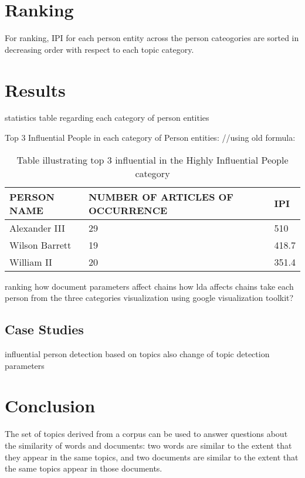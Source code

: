 \section{Ranking}
\label{influential:ranking}

For ranking, IPI for each person entity across the person cateogories are sorted in decreasing order with respect to each topic category.
  


\section{Results}
\label{influential:results}
statistics table regarding each category of person entities

Top 3  Influential People in each category of Person entities:
//using old formula:
\begin{table}
\begin{center}
    \begin{tabular}{|l|l|l|}
    \hline
    \textbf{PERSON NAME}    & \textbf{NUMBER OF ARTICLES OF OCCURRENCE} & \textbf{IPI}   \\ \hline
    Alexander III  & 29                               & 510   \\ \hline
    Wilson Barrett & 19                               & 418.7 \\ \hline
    William II     & 20                               & 351.4 \\ \hline  
  \end{tabular}
  \end{center}
    \caption {Table illustrating top 3 influential in the Highly Influential People category}
\end{table}



ranking
how document parameters affect chains
how lda affects chains
take each person from the three categories
visualization using google visualization toolkit?
\subsection{Case Studies}

influential person detection based on topics also
change of topic detection parameters
       
\section{Conclusion}
\label{influential:conclusion}

The set of topics derived from a corpus can be used to answer questions about the similarity of words and 
documents: two words are similar to the extent that they appear in the same topics, and two documents are similar to 
the extent that the same topics appear in those documents. 
                                                           
